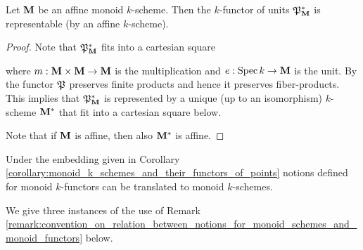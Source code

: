 \begin{proposition}
Let $\mathbf{M}$ be an affine monoid $k$-scheme. Then the $k$-functor of units ${\mathfrak P}_{\mathbf{M}}^*$ is representable (by an affine $k$-scheme).
\end{proposition}
\begin{proof}
Note that ${\mathfrak P}_{\mathbf{M}}^*$ fits into a cartesian square
\begin{center}
\end{center}
where $m:\mathbf{M}\times \mathbf{M}\rightarrow \mathbf{M}$ is the multiplication and $e:\mathrm{Spec}\, k\rightarrow \mathbf{M}$ is the unit. By {\cite[Fact 4.1]{kfunctors}} the functor ${\mathfrak P}$ preserves finite products and hence it preserves fiber-products. This implies that ${\mathfrak P}_{\mathbf{M}}^*$ is represented by a unique (up to an isomorphism) $k$-scheme $\mathbf{M}^*$ that fit into a cartesian square below.
\begin{center}
\end{center}
Note that if $\mathbf{M}$ is affine, then also $\mathbf{M}^*$ is affine.
\end{proof}

\begin{remark}\label{remark:convention_on_relation_between_notions_for_monoid_schemes_and_monoid_functors}
Under the embedding given in Corollary \ref{corollary:monoid_k_schemes_and_their_functors_of_points} notions defined for monoid $k$-functors can be translated to monoid $k$-schemes.
\end{remark}
\noindent
We give three instances of the use of Remark \ref{remark:convention_on_relation_between_notions_for_monoid_schemes_and_monoid_functors} below.

